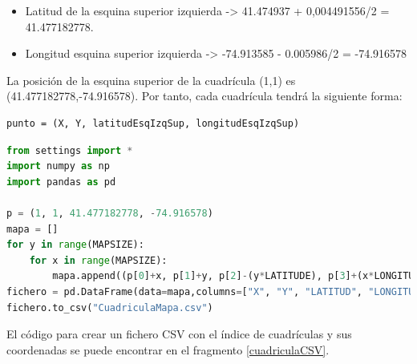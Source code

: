 \begin{itemize}
\item Latitud de la esquina superior izquierda -> 41.474937 + 0,004491556/2 = 41.477182778.
\item Longitud esquina superior izquierda -> -74.913585 - 0.005986/2 = -74.916578
\end{itemize}
    
La posición de la esquina superior de la cuadrícula (1,1) es (41.477182778,-74.916578). Por tanto, cada cuadrícula tendrá la siguiente forma:

\begin{verbatim}
punto = (X, Y, latitudEsqIzqSup, longitudEsqIzqSup)
\end{verbatim}

\begin{lstlisting}[label=cuadriculaCSV,language=Python,frame=single,caption=Código para crear fichero con las coordenadas de cada cuadrícula]
from settings import *
import numpy as np
import pandas as pd

p = (1, 1, 41.477182778, -74.916578)
mapa = []
for y in range(MAPSIZE):
    for x in range(MAPSIZE):
        mapa.append((p[0]+x, p[1]+y, p[2]-(y*LATITUDE), p[3]+(x*LONGITUDE)))
fichero = pd.DataFrame(data=mapa,columns=["X", "Y", "LATITUD", "LONGITUD"])
fichero.to_csv("CuadriculaMapa.csv")
\end{lstlisting}

El código para crear un fichero \gls{CSV} con el índice de cuadrículas y sus coordenadas se puede encontrar en el fragmento \ref{cuadriculaCSV}.